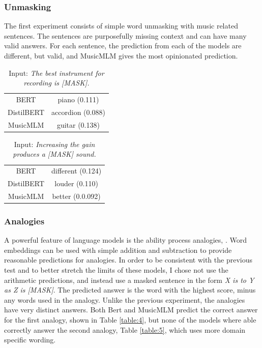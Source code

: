 \documentclass[11pt,a4paper]{article}
\begin{document}
\subsubsection{Unmasking}

The first experiment consists of simple word unmasking with music related sentences. The sentences are purposefully missing context and can have many valid answers. For each sentence, the prediction from each of the models are different, but valid, and MusicMLM gives the most opinionated prediction.

\begin{table}[h!]
\centering
\begin{tabular}{cc}
   BERT  & piano (0.111)  \\
   DistilBERT  & accordion (0.088) \\
   MusicMLM & guitar (0.138)
\end{tabular}
\label{table:2}
\caption{Input: \textit{The best instrument for recording is [MASK].}}
\end{table}

\begin{table}[h!]
\centering
\begin{tabular}{cc}
   BERT  & different (0.124)  \\
   DistilBERT  & louder (0.110) \\
   MusicMLM & better (0.0.092)
\end{tabular}
\label{table:3}
\caption{Input: \textit{Increasing the gain produces a [MASK] sound.}}
\end{table}


\subsubsection{Analogies}

A powerful feature of language models is the ability process analogies, \citep{brown2020language}. Word embeddings can be used with simple addition and subtraction to provide reasonable predictions for analogies. In order to be consistent with the previous test and to better stretch the limits of these models, I chose not use the arithmetic predictions, and instead use a masked sentence in the form \textit{X is to Y as Z is [MASK]}. The predicted answer is the word with the highest score, minus any words used in the analogy. Unlike the previous experiment, the analogies have very distinct answers. Both Bert and MusicMLM predict the correct answer for the first analogy, shown in Table \ref{table:4}, but none of the models where able correctly answer the second analogy, Table \ref{table:5}, which uses more domain specific wording.
\end{document}
